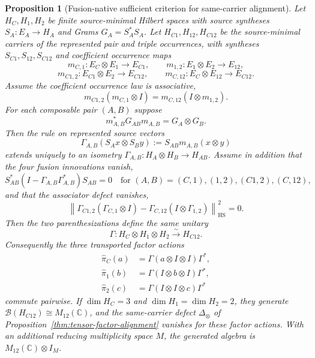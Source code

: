\documentclass[11pt]{article}
\numberwithin{equation}{section}
\newtheorem{proposition}[theorem]{Proposition}
\theoremstyle{definition}
\theoremstyle{remark}
\newcommand{\C}{\mathbb C}
\newcommand{\HS}{\mathrm{HS}}
\begin{document}
\begin{proposition}[Fusion-native sufficient criterion for same-carrier alignment]
\label{thm:fusion-native-alignment}
Let $H_C,H_1,H_2$ be finite source-minimal Hilbert spaces with source
syntheses $S_A:E_A\to H_A$ and Grams $G_A=S_A^*S_A$.  Let
$H_{C1},H_{12},H_{C12}$ be the source-minimal carriers of the represented
pair and triple occurrences, with syntheses $S_{C1},S_{12},S_{C12}$ and
coefficient occurrence maps
\[
 m_{C,1}:E_C\otimes E_1\to E_{C1},\qquad
 m_{1,2}:E_1\otimes E_2\to E_{12},
\]
\[
 m_{C1,2}:E_{C1}\otimes E_2\to E_{C12},\qquad
 m_{C,12}:E_C\otimes E_{12}\to E_{C12}.
\]
Assume the coefficient occurrence law is associative,
\begin{equation}
 m_{C1,2}(m_{C,1}\otimes I)=m_{C,12}(I\otimes m_{1,2}).
 \label{eq:fusion-coefficient-associativity}
\end{equation}
For each composable pair $(A,B)$ suppose
\begin{equation}
 m_{A,B}^*G_{AB}m_{A,B}=G_A\otimes G_B.
 \label{eq:fusion-metric-identity}
\end{equation}
Then the rule on represented source vectors
\begin{equation}
 \Gamma_{A,B}(S_Ax\otimes S_By)
 :=S_{AB}m_{A,B}(x\otimes y)
 \label{eq:fusion-isometry-definition}
\end{equation}
extends uniquely to an isometry $\Gamma_{A,B}:H_A\otimes H_B\to H_{AB}$.
Assume in addition that the four fusion innovations vanish,
\begin{equation}
 S_{AB}^*(I-\Gamma_{A,B}\Gamma_{A,B}^*)S_{AB}=0
 \quad\text{for }(A,B)=(C,1),(1,2),(C1,2),(C,12),
 \label{eq:fusion-zero-innovation}
\end{equation}
and that the associator defect vanishes,
\begin{equation}
 \left\|
 \Gamma_{C1,2}(\Gamma_{C,1}\otimes I)
 -\Gamma_{C,12}(I\otimes\Gamma_{1,2})
 \right\|_{\HS}^2=0.
 \label{eq:fusion-associator-zero}
\end{equation}
Then the two parenthesizations define the same unitary
\begin{equation}
 \Gamma:H_C\otimes H_1\otimes H_2\xrightarrow{\sim}H_{C12}.
 \label{eq:fusion-triple-unitary}
\end{equation}
Consequently the three transported factor actions
\begin{align}
 \widehat\pi_C(a)&=\Gamma(a\otimes I\otimes I)\Gamma^*,\nonumber\\
 \widehat\pi_1(b)&=\Gamma(I\otimes b\otimes I)\Gamma^*,\nonumber\\
 \widehat\pi_2(c)&=\Gamma(I\otimes I\otimes c)\Gamma^*
 \label{eq:fusion-native-actions}
\end{align}
commute pairwise.  If $\dim H_C=3$ and
$\dim H_1=\dim H_2=2$, they generate $\mathcal B(H_{C12})\cong M_{12}(\C)$,
and the same-carrier defect $\Delta_{\otimes}$ of
Proposition~\ref{thm:tensor-factor-alignment} vanishes for these factor actions.
With an additional reducing multiplicity space $M$, the generated algebra is
$M_{12}(\C)\otimes I_M$.
\end{proposition}
\end{document}
